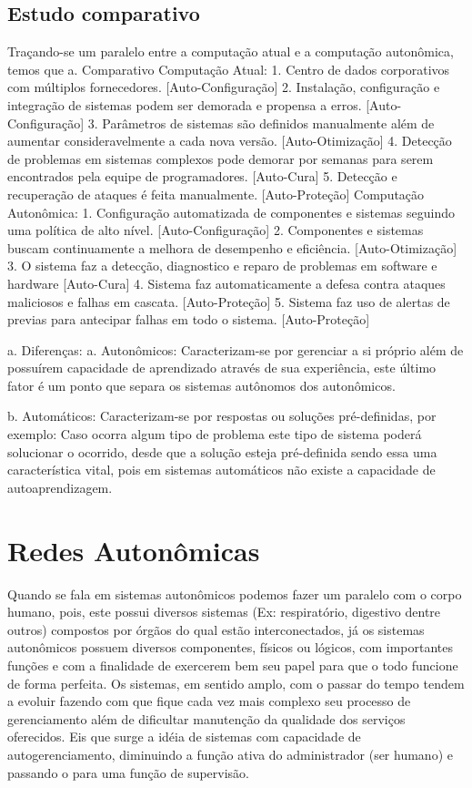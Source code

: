 \documentclass[11pt,twoside]{article}
\begin{document}
\subsection{Estudo comparativo}
Traçando-se um paralelo entre a computação atual e a computação autonômica, temos que
a.	Comparativo
Computação Atual:
1.	Centro de dados corporativos com múltiplos fornecedores. [Auto-Configuração]
2.	Instalação, configuração e integração de sistemas podem ser demorada e propensa a erros. [Auto-Configuração]
3.	Parâmetros de sistemas são definidos manualmente além de aumentar consideravelmente a cada nova versão. [Auto-Otimização]
4.	Detecção de problemas em sistemas complexos pode demorar por semanas para serem encontrados pela equipe de programadores. [Auto-Cura]
5.	Detecção e recuperação de ataques é feita manualmente. [Auto-Proteção]
Computação Autonômica:
1.	Configuração automatizada de componentes e sistemas seguindo uma política de alto nível. [Auto-Configuração]
2.	Componentes e sistemas buscam continuamente a melhora de desempenho e eficiência. [Auto-Otimização]
3.	O sistema faz a detecção, diagnostico e reparo de problemas em software e hardware [Auto-Cura]
4.	Sistema faz automaticamente a defesa contra ataques maliciosos e falhas em cascata. [Auto-Proteção]
5.	Sistema faz uso de alertas de previas para antecipar falhas em todo o sistema. [Auto-Proteção]

a.	Diferenças:
a.	Autonômicos: Caracterizam-se por gerenciar a si próprio além de possuírem capacidade de aprendizado através de sua experiência, este último fator é um ponto que separa os sistemas autônomos dos autonômicos.

b.	Automáticos: Caracterizam-se por respostas ou soluções pré-definidas, por exemplo: Caso ocorra algum tipo de problema este tipo de sistema poderá solucionar o ocorrido, desde que a solução esteja pré-definida sendo essa uma característica vital, pois em sistemas automáticos não existe a capacidade de autoaprendizagem.


\section{Redes Autonômicas}
Quando se fala em sistemas autonômicos podemos fazer um paralelo com o corpo humano, pois, este possui diversos sistemas (Ex: respiratório, digestivo dentre outros) compostos por órgãos do qual estão interconectados, já os sistemas autonômicos possuem diversos componentes, físicos ou lógicos, com importantes funções e com a finalidade de exercerem bem seu papel para que o todo funcione de forma perfeita.
Os sistemas, em sentido amplo, com o passar do tempo tendem a evoluir fazendo com que fique cada vez mais complexo seu processo de gerenciamento além de dificultar manutenção da qualidade dos serviços oferecidos. Eis que surge a idéia de sistemas com capacidade de autogerenciamento, diminuindo a função ativa do administrador (ser humano) e passando o para uma função de supervisão.
\end{document}

